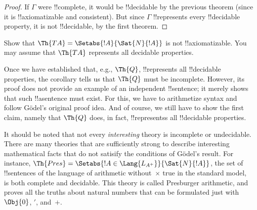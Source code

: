 \documentclass[../../../include/open-logic-section]{subfiles}
\begin{document}
\begin{proof}
If $\Gamma$ were !!{complete}, it would be !!{decidable} by the
previous theorem (since it is !!{axiomatizable} and consistent). But
since $\Gamma$ !!{represents} every !!{decidable} property, it is not
!!{decidable}, by the first theorem.
\end{proof}

\begin{prob}
Show that $\Th{TA} = \Setabs{!A}{\Sat{N}{!A}}$ is not
!!{axiomatizable}. You may assume that $\Th{TA}$ represents all
decidable properties.
\end{prob}

Once we have established that, e.g., $\Th{Q}$, !!{represents} all
!!{decidable} properties, the corollary tells us that $\Th{Q}$ must be
incomplete. However, its proof does not provide an example of an
independent !!{sentence}; it merely shows that such !!a{sentence}
must exist. For this, we have to arithmetize syntax and follow
G\"odel's original proof idea.  And of course, we still have to show
the first claim, namely that $\Th{Q}$ does, in fact, !!{represents}s
all !!{decidable} properties.

It should be noted that not every \emph{interesting} theory is
incomplete or undecidable. There are many theories that are
sufficiently strong to describe interesting mathematical facts that do
not satisify the conditions of G\"odel's result. For instance,
$\Th{Pres} = \Setabs{!A \in \Lang{L_{A^+}}}{\Sat{N}{!A}}$, the set of
!!{sentence}s of the language of arithmetic without~$\times$ true in
the standard model, is both complete and decidable. This theory is
called Presburger arithmetic, and proves all the truths about natural
numbers that can be formulated just with $\Obj{0}$, $\prime$, and~$+$.
\end{document}
